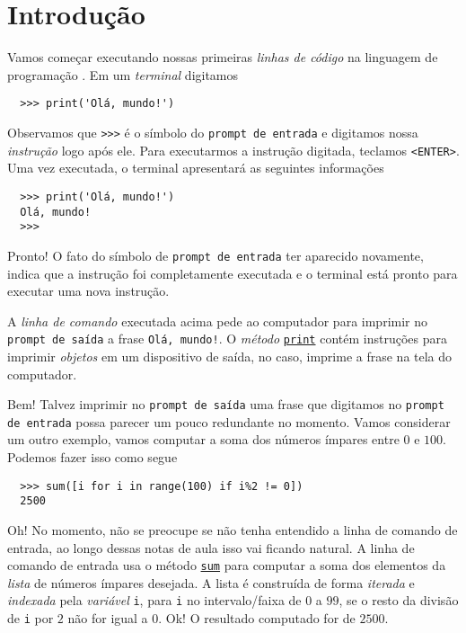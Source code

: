 
\chapter{Introdução}\label{cap_intro}
\thispagestyle{fancy}

Vamos começar executando nossas primeiras \emph{linhas de código} na linguagem de programação {\python}. Em um \emph{terminal} {\python} digitamos
\begin{lstlisting}
  >>> print('Olá, mundo!')
\end{lstlisting}
Observamos que \lstinline+>>>+ é o símbolo do \lstinline+prompt de entrada+ e digitamos nossa \emph{instrução} logo após ele. Para executarmos a instrução digitada, teclamos \lstinline+<ENTER>+. Uma vez executada, o terminal apresentará as seguintes informações
\begin{lstlisting}
  >>> print('Olá, mundo!')
  Olá, mundo!
  >>> 
\end{lstlisting}
Pronto! O fato do símbolo de \lstinline+prompt de entrada+ ter aparecido novamente, indica que a instrução foi completamente executada e o terminal está pronto para executar uma nova instrução.

A \emph{linha de comando} executada acima pede ao computador para imprimir no \lstinline+prompt de saída+ a frase \lstinline+Olá, mundo!+. O \emph{método} \href{https://docs.python.org/3/library/functions.html#print}{\lstinline+print+} contém instruções para imprimir \emph{objetos} em um dispositivo de saída, no caso, imprime a frase na tela do computador.

Bem! Talvez imprimir no \lstinline+prompt de saída+ uma frase que digitamos no \lstinline+prompt de entrada+ possa parecer um pouco redundante no momento. Vamos considerar um outro exemplo, vamos computar a soma dos números ímpares entre $0$ e $100$. Podemos fazer isso como segue
\begin{lstlisting}
  >>> sum([i for i in range(100) if i%2 != 0])
  2500
\end{lstlisting}
Oh! No momento, não se preocupe se não tenha entendido a linha de comando de entrada, ao longo dessas notas de aula isso vai ficando natural. A linha de comando de entrada usa o método \href{https://docs.python.org/3/library/functions.html#sum}{\lstinline+sum+} para computar a soma dos elementos da \emph{lista} de números ímpares desejada. A lista é construída de forma \emph{iterada} e \emph{indexada} pela \emph{variável} \lstinline+i+, para \lstinline+i+ no intervalo/faixa de $0$ a $99$, se o resto da divisão de \lstinline+i+ por $2$ não for igual a $0$. Ok! O resultado computado for de $2500$.

